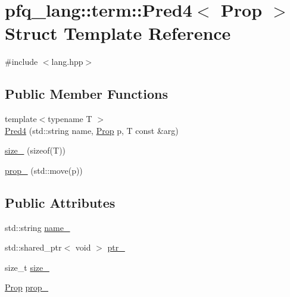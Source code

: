 \hypertarget{structpfq__lang_1_1term_1_1Pred4}{\section{pfq\-\_\-lang\-:\-:term\-:\-:Pred4$<$ Prop $>$ Struct Template Reference}
\label{structpfq__lang_1_1term_1_1Pred4}
}


{\ttfamily \#include $<$lang.\-hpp$>$}

\subsection*{Public Member Functions}
\begin{DoxyCompactItemize}
\item 
{\footnotesize template$<$typename T $>$ }\\\hyperlink{structpfq__lang_1_1term_1_1Pred4_abf90853e9f4772dd71304ed27efce869}{Pred4} (std\-::string name, \hyperlink{structpfq__lang_1_1term_1_1Prop}{Prop} p, T const \&arg)
\item 
\hyperlink{structpfq__lang_1_1term_1_1Pred4_a91acc0daa52d85a0a16e3a340fe88233}{size\-\_\-} (sizeof(T))
\item 
\hyperlink{structpfq__lang_1_1term_1_1Pred4_ae172772d16d3b2bbc2e6c3e4277c6b60}{prop\-\_\-} (std\-::move(p))
\end{DoxyCompactItemize}
\subsection*{Public Attributes}
\begin{DoxyCompactItemize}
\item 
std\-::string \hyperlink{structpfq__lang_1_1term_1_1Pred4_a57f3123042c7ab4bba88d975449624b5}{name\-\_\-}
\item 
std\-::shared\-\_\-ptr$<$ void $>$ \hyperlink{structpfq__lang_1_1term_1_1Pred4_abb2d1d1471c132aa44cb302ff97cb5d3}{ptr\-\_\-}
\item 
size\-\_\-t \hyperlink{structpfq__lang_1_1term_1_1Pred4_a8b048607b50bc442cf98b31987df7a53}{size\-\_\-}
\item 
\hyperlink{structpfq__lang_1_1term_1_1Prop}{Prop} \hyperlink{structpfq__lang_1_1term_1_1Pred4_ab5f3d36392d98a2549b8e517f8919163}{prop\-\_\-}
\end{DoxyCompactItemize}


